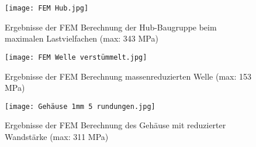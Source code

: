 \begin{figure}[h]
\centering
\texttt{[image: FEM Hub.jpg]}
\caption{Ergebnisse der FEM Berechnung der Hub-Baugruppe beim maximalen Lastvielfachen (max: 343 MPa)}
\end{figure}
\begin{figure}[h]
\centering
\texttt{[image: FEM Welle verstümmelt.jpg]}
\caption{Ergebnisse der FEM Berechnung massenreduzierten Welle (max: 153 MPa)}
\end{figure}
\begin{figure}[h]
\centering
\texttt{[image: Gehäuse 1mm 5 rundungen.jpg]}
\caption{Ergebnisse der FEM Berechnung des Gehäuse mit reduzierter Wandstärke (max: 311 MPa)}
\end{figure}
